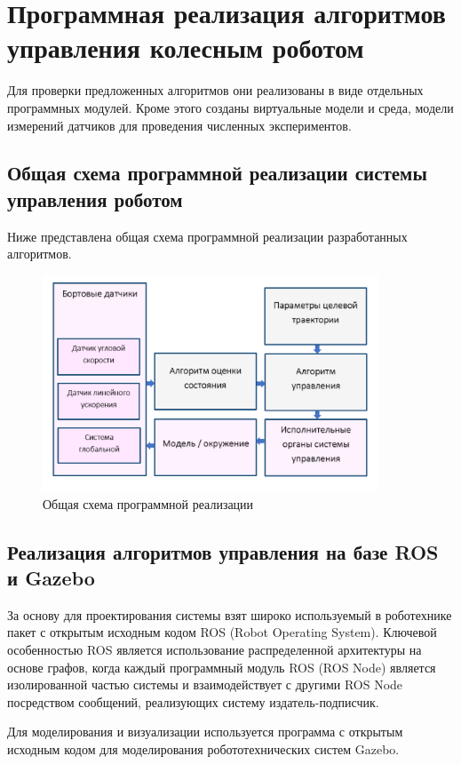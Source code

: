 \documentclass[a4paper,12pt]{article}
\begin{document}
\section{Программная реализация алгоритмов управления колесным роботом}
Для проверки предложенных алгоритмов они реализованы в виде отдельных программных модулей. Кроме этого созданы виртуальные модели и среда, модели измерений датчиков для проведения численных экспериментов. 

\subsection{Общая схема программной реализации системы управления роботом}
Ниже представлена общая схема программной реализации разработанных алгоритмов.
\begin{figure}[h!]
	\centering
	\includegraphics[width=10cm,clip]{pic/common_code_scheme}
	\caption{Общая схема программной реализации}
	\label{pic:common_code_scheme}
\end{figure}

\subsection{Реализация алгоритмов управления на базе ROS и Gazebo}
За основу для проектирования системы взят широко используемый в роботехнике пакет с открытым исходным кодом ROS (Robot Operating System). Ключевой особенностью ROS является использование распределенной архитектуры на основе графов, когда каждый программный модуль ROS (ROS Node) является изолированной частью системы и взаимодействует с другими ROS Node посредством сообщений, реализующих систему издатель-подписчик.

Для моделирования и визуализации используется программа с открытым исходным кодом для моделирования робототехнических систем Gazebo.
\end{document}
